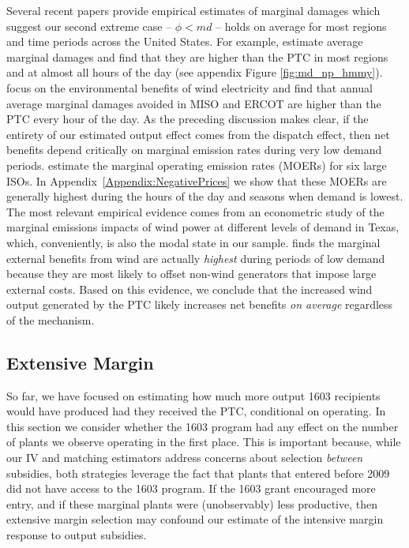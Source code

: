 \documentclass[12pt]{article}
\begin{document}
Several recent papers provide empirical estimates of marginal damages which suggest our second extreme case -- $\phi < md$  -- holds on average for most regions and time periods across the United States. For example, \citet{holland_are_2016} estimate average marginal damages and find that they are higher than the PTC in most regions and at almost all hours of the day (see appendix Figure \ref{fig:md_np_hmmy}). \citet{fell_emissions_nodate} focus on the environmental benefits of wind electricity and find that annual average marginal damages avoided in MISO and ERCOT are higher than the PTC every hour of the day. As the preceding discussion makes clear, if the entirety of our estimated output effect comes from the dispatch effect, then net benefits depend critically on marginal emission rates during very low demand periods. \citet{callaway_location_2018} estimate the marginal operating emission rates (MOERs) for six large ISOs. In Appendix~\ref{Appendix:NegativePrices} we show that these MOERs are generally highest during the hours of the day and seasons when demand is lowest. The most relevant empirical evidence comes from an econometric study of the marginal emissions impacts of wind power at different levels of demand in Texas, which, conveniently, is also the modal state in our sample. \citet{novan_valuing_2015} finds the marginal external benefits from wind are actually \emph{highest} during periods of low demand because they are most likely to offset non-wind generators that impose large external costs. Based on this evidence, we conclude that the increased wind output generated by the PTC likely increases net benefits \emph{on average} regardless of the mechanism. 

\subsection{Extensive Margin \label{subsec:Extensive}}

So far, we have focused on estimating how much more output 1603 recipients would have produced had they received the PTC, conditional on operating. In this section we consider whether the 1603 program had any effect on the number of plants we observe operating in the first place. This is important because, while our IV and matching estimators address concerns about selection \textit{between} subsidies, both strategies leverage the fact that plants that entered before 2009 did not have access to the 1603 program. If the 1603 grant encouraged more entry, and if these marginal plants were (unobservably) less productive, then extensive margin selection may confound our estimate of the intensive margin response to output subsidies. 
\end{document}
